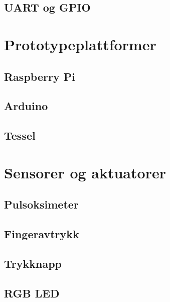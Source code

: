 \subsection{UART og GPIO}
\blindtext

\section{Prototypeplattformer}
\blindtext
\subsection{Raspberry Pi}
\blindtext
\subsection{Arduino}
\blindtext
\subsection{Tessel}
\blindtext

\section{Sensorer og aktuatorer}
\blindtext
\subsection{Pulsoksimeter}
\blindtext
\subsection{Fingeravtrykk}
\blindtext
\subsection{Trykknapp}
\blindtext
\subsection{RGB LED}
\blindtext
